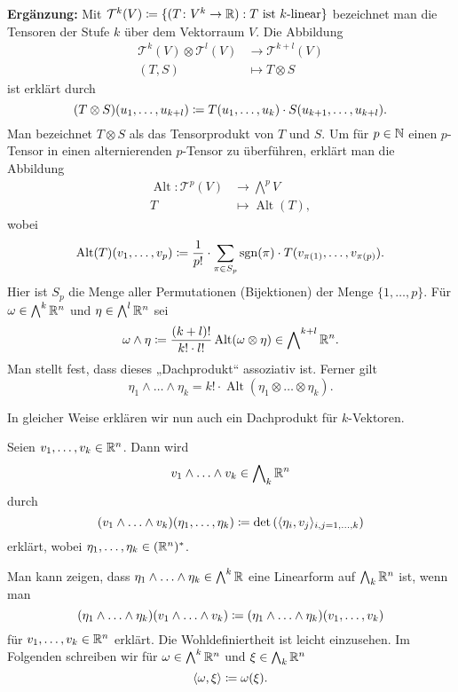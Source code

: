 \documentclass[a4paper,twoside,DIV15,BCOR12mm]{scrbook}
\newcommand{\bw}{\bigwedge\nolimits}
\DeclareMathOperator{\sgn}{sgn}
\begin{document}
\textbf{Ergänzung:} Mit $\mathcal T^k(V)\da \{ (T\colon V^k\to\MdR) : T \text{ ist $k$-linear}\}$ bezeichnet man die Tensoren der Stufe $k$ über dem Vektorraum $V$. Die Abbildung
\begin{align*}
\mathcal T^k(V) \otimes \mathcal T^l(V) &\to \mathcal T^{k+l}(V) \\
(T,S) &\mapsto T\otimes S
\end{align*}
ist erklärt durch
\[
(T\otimes S)(u_1,\ldots,u_{k+l}) \da T(u_1,\ldots,u_k) \cdot S(u_{k+1},\ldots,u_{k+l}).
\]
Man bezeichnet $T\otimes S$ als das Tensorprodukt von $T$ und $S$. 
Um für $p\in\mathbb{N}$ einen $p$-Tensor in einen alternierenden $p$-Tensor zu überführen, 
erklärt man  die Abbildung
\begin{align*}
\operatorname{Alt}\colon \mathcal T^p(V) &\to \bw^p V\\
T & \mapsto \operatorname{Alt}(T),
\end{align*}
wobei
\[
\operatorname{Alt}(T)(v_1,\ldots,v_p) \da \frac{1}{p!} \cdot \sum_{\pi\in S_p} \sgn(\pi) \cdot T(v_{\pi(1)},\ldots,v_{\pi(p)}).
\]
Hier ist $S_p$ die Menge aller Permutationen (Bijektionen) der Menge $\{1,\ldots,p\}$. 
Für $\omega\in \bw^k\MdR^n$ und $\eta\in \bw^l\MdR^n$ sei
\[
\omega \wedge \eta \da \frac{(k+l)!}{k!\cdot l!} \operatorname{Alt}(\omega\otimes \eta) \in \bw^{k+l}\MdR^n.
\]
Man stellt fest, dass dieses „Dachprodukt“ assoziativ ist. Ferner gilt
$$
\eta_1\wedge \ldots\wedge \eta_k=k!\cdot \operatorname{Alt}(\eta_1\otimes\ldots\otimes \eta_k).
$$

In gleicher Weise erklären wir nun auch ein Dachprodukt für $k$-Vektoren.


\begin{definition}
Seien $v_1,\ldots,v_k\in \mathbb{R}^n$. Dann wird
\[
v_1\wedge \ldots\wedge v_k \in \bw_k\MdR^n
\]
durch
\[
(v_1\wedge \ldots\wedge v_k)(\eta_1,\ldots,\eta_k) \da \det\left( \langle \eta_i,v_j\rangle_{i,j=1,\ldots,k}\right)
\]
erklärt, wobei $\eta_1,\ldots,\eta_k\in(\mathbb{R}^n)^*$. 
\end{definition}


Man kann zeigen, dass
$\eta_1\wedge\ldots\wedge \eta_k\in\bw^k\MdR$ eine Linearform auf $\bw_k\MdR^n$ 
ist, wenn man
$$
(\eta_1\wedge\ldots\wedge \eta_k)(v_1\wedge\ldots\wedge v_k)\da (\eta_1\wedge\ldots\wedge \eta_k)(v_1,\ldots, v_k)
$$
für $v_1,\ldots,v_k\in\mathbb{R}^n$ erklärt. Die Wohldefiniertheit ist leicht einzusehen. Im Folgenden schreiben 
wir für $\omega\in\bigwedge^k\mathbb{R}^n$ und $\xi\in\bigwedge_k\mathbb{R}^n$ 
$$
\langle \omega,\xi\rangle\da \omega(\xi).
$$
\end{document}
